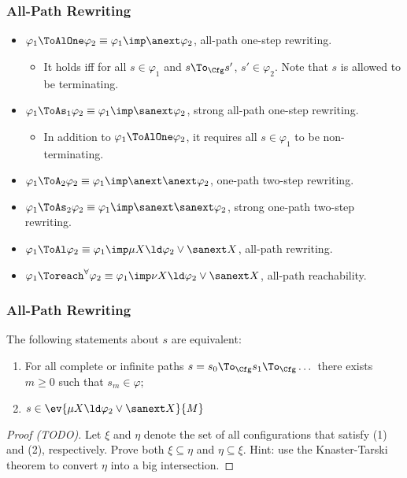 \begin{frame}
\frametitle{All-Path Rewriting}
\begin{itemize}
\item $\varphi_1 \ToAlOne \varphi_2 \equiv 
       \varphi_1 \imp \anext \varphi_2$,
all-path one-step rewriting.
\begin{itemize}
\item It holds iff for all $s \in \varphi_1$ and $s \To_\Cfg s'$,
      $s' \in \varphi_2$.
      Note that $s$ is allowed to be terminating.
\end{itemize}
\item $\varphi_1 \ToAs_1 \varphi_2 \equiv 
       \varphi_1 \imp \sanext \varphi_2$,
strong all-path one-step rewriting.
\begin{itemize}
\item In addition to $\varphi_1 \ToAlOne \varphi_2$, it requires
      all $s \in \varphi_1$ to be non-terminating.
\end{itemize}
\item $\varphi_1 \ToA_2 \varphi_2 \equiv 
       \varphi_1 \imp \anext\anext \varphi_2$,
one-path two-step rewriting.
\item $\varphi_1 \ToAs_2 \varphi_2 \equiv 
       \varphi_1 \imp \sanext\sanext \varphi_2$,
strong one-path two-step rewriting.
\item $\varphi_1 \ToAl \varphi_2 \equiv
       \varphi_1 \imp \mu X \ld \varphi_2 \lor \sanext X$, all-path
       rewriting.
\item $\varphi_1 \Toreach^\forall \varphi_2 \equiv
       \varphi_1 \imp \nu X \ld \varphi_2 \lor \sanext X$, all-path
       reachability.
\end{itemize}
\end{frame}

\begin{frame}
\frametitle{All-Path Rewriting}
\begin{lemma}
The following statements about $s$ are equivalent:
\begin{enumerate}
\item For all complete or infinite paths
      $s = s_0 \To_\Cfg s_1 \To_\Cfg \dots$
      there exists $m \ge 0$ such that $s_m \in \varphi$;
\item $s \in \ev{\mu X \ld \varphi_2 \lor \sanext X}{M}$
\end{enumerate}
\end{lemma}
\begin{proof}[Proof (TODO)]
Let $\xi$ and $\eta$ denote the set of all configurations
that satisfy (1) and (2), respectively.
Prove both $\xi \subseteq \eta$ and $\eta \subseteq \xi$.
Hint: use the Knaster-Tarski theorem to convert
$\eta$ into a big intersection.
\end{proof}
\end{frame}

